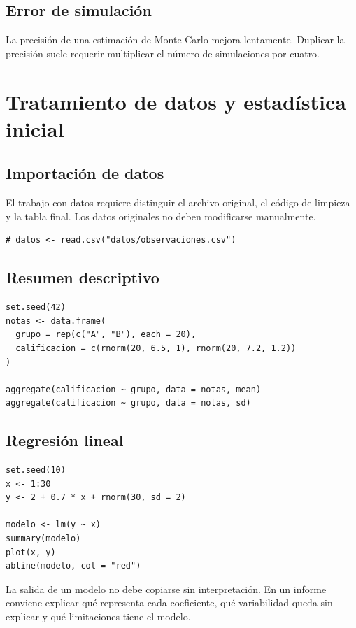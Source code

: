 \documentclass[11pt,a4paper,oneside]{book}
\begin{document}
\section{Error de simulación}
La precisión de una estimación de Monte Carlo mejora lentamente. Duplicar la precisión suele requerir multiplicar el número de simulaciones por cuatro.

\chapter{Tratamiento de datos y estadística inicial}

\section{Importación de datos}
El trabajo con datos requiere distinguir el archivo original, el código de limpieza y la tabla final. Los datos originales no deben modificarse manualmente.

\begin{lstlisting}[style=rstyle]
# datos <- read.csv("datos/observaciones.csv")
\end{lstlisting}

\section{Resumen descriptivo}
\begin{lstlisting}[style=rstyle]
set.seed(42)
notas <- data.frame(
  grupo = rep(c("A", "B"), each = 20),
  calificacion = c(rnorm(20, 6.5, 1), rnorm(20, 7.2, 1.2))
)

aggregate(calificacion ~ grupo, data = notas, mean)
aggregate(calificacion ~ grupo, data = notas, sd)
\end{lstlisting}

\section{Regresión lineal}
\begin{lstlisting}[style=rstyle]
set.seed(10)
x <- 1:30
y <- 2 + 0.7 * x + rnorm(30, sd = 2)

modelo <- lm(y ~ x)
summary(modelo)
plot(x, y)
abline(modelo, col = "red")
\end{lstlisting}

La salida de un modelo no debe copiarse sin interpretación. En un informe conviene explicar qué representa cada coeficiente, qué variabilidad queda sin explicar y qué limitaciones tiene el modelo.
\end{document}
